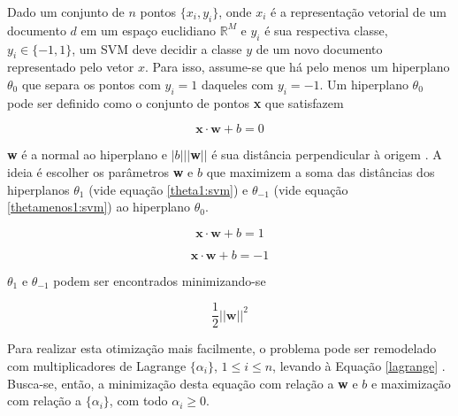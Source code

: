Dado um conjunto de \ensuremath{n} pontos \ensuremath{\{x_i, y_i\}}, onde \ensuremath{x_i} é a representação vetorial de um documento \ensuremath{d} em um espaço euclidiano \ensuremath{\mathbb{R}^M} e \ensuremath{y_i} é sua respectiva classe, \ensuremath{y_i \in \{-1, 1\}}, um SVM deve decidir a classe \ensuremath{y} de um novo documento representado pelo vetor \ensuremath{x}. Para isso, assume-se que há pelo menos um hiperplano \ensuremath{\theta_0} que separa os pontos  com \ensuremath{y_i = 1} daqueles com \ensuremath{y_i = -1}. Um hiperplano \ensuremath{\theta_0} pode ser definido como o conjunto de pontos \textbf{x} que satisfazem

\begin{equation}
\label{function:svm}
\textbf{x} \ensuremath{\cdot} \textbf{w} + \ensuremath{b} = 0
\end{equation}

\textbf{w} é a normal ao hiperplano e \ensuremath{|b|||}\textbf{w}\ensuremath{||} é sua distância perpendicular à origem \cite{mono-puc}. A ideia é escolher os parâmetros \textbf{w} e \ensuremath{b} que maximizem a soma das distâncias dos hiperplanos \ensuremath{\theta_1} (vide equação \ref{theta1:svm}) e \ensuremath{\theta_{-1}} (vide equação \ref{thetamenos1:svm}) ao hiperplano \ensuremath{\theta_0}. 

\begin{equation}
\label{theta1:svm}
\textbf{x} \ensuremath{\cdot} \textbf{w} + \ensuremath{b} = 1
\end{equation}

\begin{equation}
\label{thetamenos1:svm}
\textbf{x} \ensuremath{\cdot} \textbf{w} + \ensuremath{b} = -1
\end{equation}

\ensuremath{\theta_1} e \ensuremath{\theta_{-1}} podem ser encontrados minimizando-se 

\begin{equation}
\label{optim:svm}
\ensuremath{\frac{1}{2}||}\textbf{w}\ensuremath{||^2}
\end{equation}

Para realizar esta otimização mais facilmente, o problema pode ser remodelado com multiplicadores de Lagrange \ensuremath{\{\alpha_i\}}, \ensuremath{1 \leq i \leq n}, levando à Equação \ref{lagrange} \cite{mono-puc}. Busca-se, então, a minimização desta equação com relação a \textbf{w} e \ensuremath{b} e maximização com relação a \ensuremath{\{\alpha_i\}}, com todo \ensuremath{\alpha_i \geq 0}.


